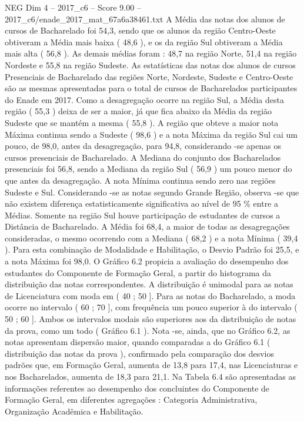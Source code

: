 \begin{textsample}{NEG Dim 4 – 2017\_c6 – Score 9.00 – 2017\_c6/enade\_2017\_mat\_67a6a38461.txt}
A Média das notas dos alunos de cursos de Bacharelado foi 54,3, sendo que os alunos da região Centro-Oeste obtiveram a Média mais baixa ( 48,6 ), e os da região Sul obtiveram a Média mais alta ( 56,8 ).
As demais médias foram : 48,7 na região Norte, 51,4 na região Nordeste e 55,8 na região Sudeste.
As estatísticas das notas dos alunos de cursos Presenciais de Bacharelado das regiões Norte, Nordeste, Sudeste e Centro-Oeste são as mesmas apresentadas para o total de cursos de Bacharelados participantes do Enade em 2017.
Como a desagregação ocorre na região Sul, a Média desta região ( 55,3 ) deixa de ser a maior, já que fica abaixo da Média da região Sudeste que se mantém a mesma ( 55,8 ).
A região que obteve a maior nota Máxima continua sendo a Sudeste ( 98,6 ) e a nota Máxima da região Sul cai um pouco, de 98,0, antes da desagregação, para 94,8, considerando -se apenas os cursos presenciais de Bacharelado.
A Mediana do conjunto dos Bacharelados presenciais foi 56,8, sendo a Mediana da região Sul ( 56,9 ) um pouco menor do que antes da desagregação.
A nota Mínima continua sendo zero nas regiões Sudeste e Sul.
Considerando -se as notas segundo Grande Região, observa -se que não existem diferença estatisticamente significativa ao nível de 95 \% entre a Médias.
Somente na região Sul houve participação de estudantes de cursos a Distância de Bacharelado.
A Média foi 68,4, a maior de todas as desagregações consideradas, o mesmo ocorrendo com a Mediana ( 68,2 ) e a nota Mínima ( 39,4 ).
Para esta combinação de Modalidade e Habilitação, o Desvio Padrão foi 25,5, e a nota Máxima foi 98,0.
O Gráfico 6.2 propicia a avaliação do desempenho dos estudantes do Componente de Formação Geral, a partir do histograma da distribuição das notas correspondentes.
A distribuição é unimodal para as notas de Licenciatura com moda em ( 40 ; 50 ].
Para as notas do Bacharelado, a moda ocorre no intervalo ( 60 ; 70 ], com frequência um pouco superior à do intervalo ( 50 ; 60 ].
Ambos os intervalos modais são superiores aos da distribuição de notas da prova, como um todo ( Gráfico 6.1 ).
Nota -se, ainda, que no Gráfico 6.2, as notas apresentam dispersão maior, quando comparadas a do Gráfico 6.1 ( distribuição das notas da prova ), confirmado pela comparação dos desvios padrões que, em Formação Geral, aumenta de 13,8 para 17,4, nas Licenciaturas e nos Bacharelados, aumenta de 18,3 para 21,1.
Na Tabela 6.4 são apresentadas as informações referentes ao desempenho dos concluintes do Componente de Formação Geral, em diferentes agregações : Categoria Administrativa, Organização Acadêmica e Habilitação.

\end{textsample}
